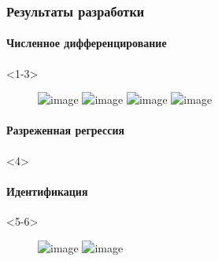 \documentclass[pdf, hyperref={unicode}, aspectratio=169]{beamer}
\begin{document}
\begin{frame}
\frametitle{Результаты разработки}

\framesubtitle<1-3>{Численное дифференцирование}
\begin{onlyenv}<1-3>
\begin{figure}
\includegraphics<1>[width=0.49\linewidth]{img/alpha_fast_tvr}
\includegraphics<1>[width=0.49\linewidth]{img/alpha_tvr}
\includegraphics<2>[width=\textwidth]{img/sin_dif_test}
\includegraphics<3>[height=0.75\textheight]{img/lorenz_dif_test}
\end{figure}
\end{onlyenv}

\framesubtitle<4>{Разреженная регрессия}
\begin{onlyenv}<4>
\begin{figure}
\hfill
{}
\end{figure}
\end{onlyenv}

\framesubtitle<5-10>{Идентификация}
\begin{onlyenv}<5-6>
\begin{figure}
\includegraphics<5>[width=\textwidth]{img/lorenz_test}
\includegraphics<6>[height=0.8\textheight]{img/lorenz_scores}
\end{figure}
\end{onlyenv}


\end{frame}
\end{document}
